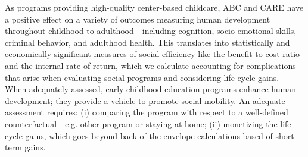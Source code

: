 \noindent As programs providing high-quality center-based childcare, ABC and CARE have a positive effect on a variety of outcomes measuring human development throughout childhood to adulthood---including cognition, socio-emotional skills, criminal behavior, and adulthood health. This translates into statistically and economically significant measures of social efficiency like the benefit-to-cost ratio and the internal rate of return, which we calculate accounting for complications that arise when evaluating social programs and considering life-cycle gains.\\

\noindent When adequately assessed, early childhood education programs enhance human development; they provide a vehicle to promote social mobility. An adequate assessment requires: (i) comparing the program with respect to a well-defined counterfactual---e.g. other program or staying at home; (ii) monetizing the life-cycle gains, which goes beyond back-of-the-envelope calculations based of short-term gains. 

\singlespace



 